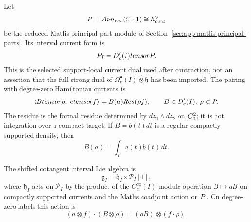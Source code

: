 \begin{defn}
\label{def:app-factorization-current-dual}
  Let
  \[
    P=Ann_{res}(C\cdot1)
      \cong h^\vee_{cont}
  \]
  be the reduced Matlis principal-part module of
  Section~\ref{sec:app-matlis-principal-parts}.  Its interval current
  form is
  \[
    P_I=D'_c(I)tensorP .
  \]
  This is the selected support-local current dual used after
  contraction, not an assertion that the full strong dual of
  \(\Omega_c^\bullet(I)\widehat\otimes\mathfrak h\) has been imported.
  The pairing with degree-zero Hamiltonian currents is
  \[
    \langle Btensor\rho,\;atensor f\rangle
      =B(a)Res(\rho f),
      \qquad
      B\in D'_c(I),\ \rho\in P.
  \]
  The residue is the formal residue determined by
  \(dz_1\wedge dz_2\) on \(C^2_0\); it is not integration
  over a compact target.
  If \(B=b(t)dt\) is a regular compactly supported density, then
  \[
    B(a)=\int_Ia(t)b(t)\,dt .
  \]

  The shifted cotangent interval Lie algebra is
  \[
    \mathfrak g_I=\mathfrak h_I\ltimes\mathcal P_I[1],
  \]
  where \(\mathfrak h_I\) acts on \(\mathcal P_I\) by the product of
  the \(C_c^\infty(I)\)-module operation \(B\mapsto aB\) on compactly
  supported currents and the Matlis coadjoint action
  on \(P\).  On degree-zero labels this action is
  \[
    (a\otimes f)\cdot(B\otimes\rho)
      =(aB)\otimes(f\cdot\rho).
  \]
\end{defn}

